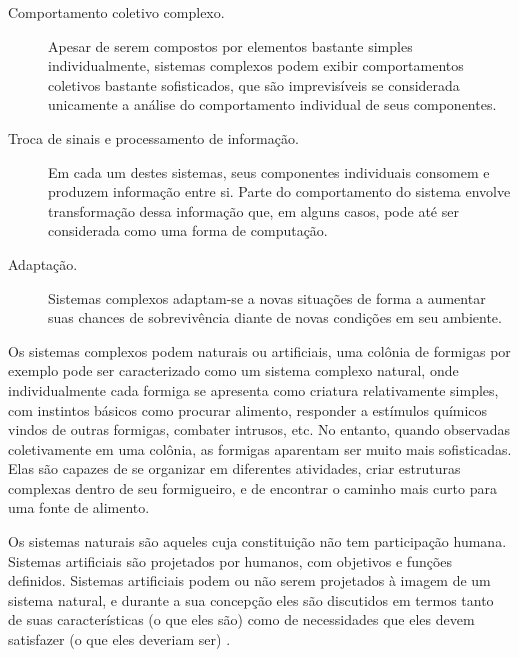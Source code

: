 \begin{description}

  \item[Comportamento coletivo complexo.] Apesar de serem compostos por
  elementos bastante simples individualmente, sistemas complexos podem exibir
  comportamentos coletivos bastante sofisticados, que são imprevisíveis se
  considerada unicamente a análise do comportamento individual de seus
  componentes.

  \item[Troca de sinais e processamento de informação.] Em cada um destes
  sistemas, seus componentes individuais consomem e produzem informação entre
  si. Parte do comportamento do sistema envolve transformação dessa informação
  que, em alguns casos, pode até ser considerada como uma forma de computação.


  \item[Adaptação.] Sistemas complexos adaptam-se a novas situações de forma a
  aumentar suas chances de sobrevivência diante de novas condições em seu
  ambiente.

\end{description}

Os sistemas complexos podem naturais ou artificiais, uma colônia de formigas
por exemplo pode ser caracterizado como um sistema complexo natural, onde
individualmente cada formiga se apresenta como criatura relativamente simples,
com instintos básicos como procurar alimento, responder a estímulos químicos
vindos de outras formigas, combater intrusos, etc. No entanto, quando
observadas coletivamente em uma colônia, as formigas aparentam ser muito mais
sofisticadas. Elas são capazes de se organizar em diferentes atividades, criar
estruturas complexas dentro de seu formigueiro, e de encontrar o caminho mais
curto para uma fonte de alimento.

Os sistemas naturais são aqueles cuja constituição não tem participação humana.
Sistemas artificiais são projetados por humanos, com objetivos e funções
definidos.  Sistemas artificiais podem ou não serem projetados à imagem de um
sistema natural, e durante a sua concepção eles são discutidos em termos tanto
de suas características (o que eles são) como de necessidades que eles devem
satisfazer (o que eles deveriam ser) \cite{Simon1996}.


